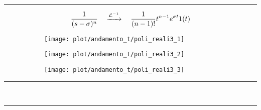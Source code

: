 \documentclass[../main.tex]{subfiles}
\begin{document}
	\rule{\linewidth}{0.4pt}
	\[ \frac{1}{(s-\sigma)^n} \quad \xrightarrow{\mathcal{L}^{-1}} \quad \frac{1}{(n-1)!} t^{n-1} e^{\sigma t} 1(t) \]
	\begin{figure}[h!]
		\centering
		\begin{subfigure}{0.3\textwidth}
			\texttt{[image: plot/andamento\_t/poli\_reali3\_1]}
		\end{subfigure}
		\begin{subfigure}{0.3\textwidth}
			\texttt{[image: plot/andamento\_t/poli\_reali3\_2]}
		\end{subfigure}
		\begin{subfigure}{0.3\textwidth}
			\texttt{[image: plot/andamento\_t/poli\_reali3\_3]}
		\end{subfigure}
	\end{figure}
	\newpage
	\noindent
	\rule{\linewidth}{0.4pt}\\%
	\rule{\linewidth}{0.4pt}%
\end{document}
